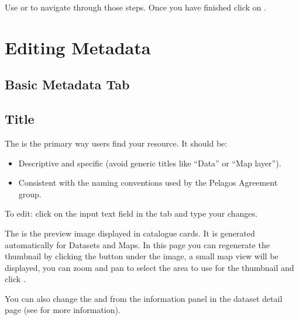 \documentclass[letterpaper,10pt,english]{sphinxmanual}
\begin{document}
\sphinxAtStartPar
Use  or  to navigate through those steps. Once you have finished click on .


\section{Editing Metadata}
\label{\detokenize{03_managing_metadata:editing-metadata}}

\subsection{Basic Metadata Tab}
\label{\detokenize{03_managing_metadata:basic-metadata-tab}}

\subsection{Title}
\label{\detokenize{03_managing_metadata:title}}
\sphinxAtStartPar
The  is the primary way users find your resource. It should be:
\begin{itemize}
\item {} 
\sphinxAtStartPar
Descriptive and specific (avoid generic titles like “Data” or “Map layer”).

\item {} 
\sphinxAtStartPar
Consistent with the naming conventions used by the Pelagos Agreement group.

\end{itemize}

\sphinxAtStartPar
To edit: click on the  input text field in the  tab and type your changes.

\sphinxAtStartPar
The  is the preview image displayed in catalogue cards. It is generated
automatically for Datasets and Maps. In this page you can re\sphinxhyphen{}generate the thumbnail
by clicking the  button under the image, a small map view will be displayed,
you can zoom and pan to select the area to use for the thumbnail and click .

\sphinxAtStartPar
You can also change the  and  from
the information panel in the dataset detail page (see {\hyperref[\detokenize{02_find_and_visualize:information-panel}]{}} for more information).
\end{document}
